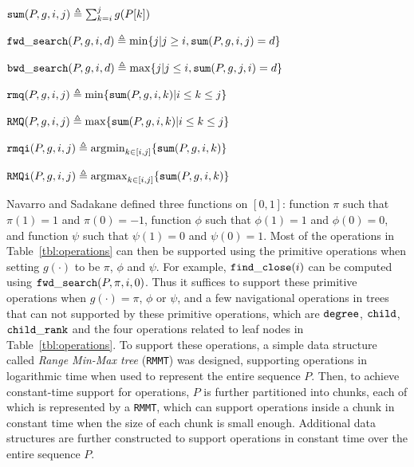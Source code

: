 \begin{myitemize}
\item $\mathtt{sum}(P,g,i,j)\triangleq \sum_{k=i}^jg(P[k])$
\item $\mathtt{fwd\_search}(P,g,i,d)\triangleq \min\{j | j \ge i, \mathtt{sum}(P,g,i,j) = d\}$
\item $\mathtt{bwd\_search}(P,g,i,d)\triangleq \max\{j | j \le i, \mathtt{sum}(P,g,j,i) = d\}$
\item $\mathtt{rmq}(P,g,i,j)\triangleq \min\{\mathtt{sum}(P,g,i,k)| i\le k\le j\}$
\item $\mathtt{RMQ}(P,g,i,j)\triangleq \max\{\mathtt{sum}(P,g,i,k)| i\le k\le j\}$
\item $\mathtt{rmqi}(P,g,i,j)\triangleq \operatorname*{arg\!\min}_{k\in[i,j]}\{\mathtt{sum}(P,g,i,k)\}$
\item $\mathtt{RMQi}(P,g,i,j)\triangleq \operatorname*{arg\!\max}_{k\in[i,j]}\{\mathtt{sum}(P,g,i,k)\}$
\end{myitemize}

Navarro and Sadakane defined three functions on $[0,1]$: function $\pi$ such that $\pi(1) = 1$ and $\pi(0) = -1$, function $\phi$ such that $\phi(1) = 1$ and $\phi(0) = 0$, and function $\psi$ such that $\psi(1) = 0$ and $\psi(0) = 1$. 
Most of the operations in Table~\ref{tbl:operations} can then be supported using the primitive operations when setting $g(\cdot)$ to be $\pi$, $\phi$ and $\psi$. For example, $\mathtt{find\_close}(i)$ can be computed using $\mathtt{fwd\_search}(P,\pi,i,0)$. 
Thus it suffices to support these primitive operations when $g(\cdot) = \pi$, $\phi$ or $\psi$, and a few  navigational operations in trees that can not supported by these primitive operations, which are $\mathtt{degree}$, $\mathtt{child}$, $\mathtt{child\_rank}$ and the four operations related to leaf nodes in Table~\ref{tbl:operations}. 
To support these operations, a simple data structure called \emph{Range Min-Max tree} ({\tt RMMT}) was designed, supporting operations in logarithmic time when used to represent the entire sequence $P$. 
Then, to achieve constant-time support for operations, $P$ is further partitioned into chunks, each of which is represented by a {\tt RMMT}, which can support operations inside a chunk in constant time when the size of each chunk is small enough. Additional data structures are further constructed to support operations in constant time over the entire sequence $P$. 

